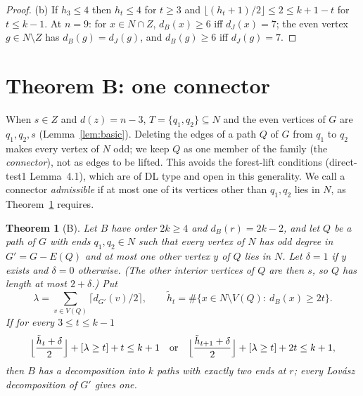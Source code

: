 \documentclass[11pt]{amsart}
\newtheorem{theorem}{Theorem}[section]
\theoremstyle{definition}
\begin{document}
\begin{proof}
(b) If $h_3\le4$ then $h_t\le4$ for $t\ge3$ and $\lfloor(h_t+1)/2\rfloor\le2\le k+1-t$ for
$t\le k-1$. At $n=9$: for $x\in N\cap Z$, $d_B(x)\ge6$ iff $d_J(x)=7$; the even vertex $g\in N\setminus Z$
has $d_B(g)=d_J(g)$, and $d_B(g)\ge6$ iff $d_J(g)=7$.
\end{proof}

\section{Theorem B: one connector}\label{sec:B}

When $s\in Z$ and $d(z)=n-3$, $T=\{q_1,q_2\}\subseteq N$ and the even vertices of $G$ are $q_1,q_2,s$
(Lemma~\ref{lem:basic}). Deleting the edges of a path $Q$ of $G$ from $q_1$ to $q_2$ makes every vertex
of $N$ odd; we keep $Q$ as one member of the family (the \emph{connector}), not as edges to be lifted.
This avoids the forest-lift conditions (direct-test1 Lemma~4.1), which are of DL type and open in this
generality. We call a connector \emph{admissible} if at most one of its vertices other than $q_1,q_2$
lies in $N$, as Theorem~\ref{thm:B} requires.

\begin{theorem}[B]\label{thm:B}
Let $B$ have order $2k\ge4$ and $d_B(r)=2k-2$, and let $Q$ be a path of $G$ with ends $q_1,q_2\in N$
such that every vertex of $N$ has odd degree in $G'=G-E(Q)$ and at most one other vertex $y$ of $Q$
lies in $N$. Let $\delta=1$ if $y$ exists and $\delta=0$ otherwise. (The other interior vertices of $Q$
are then $s$, so $Q$ has length at most $2+\delta$.) Put
\[
\lambda=\sum_{v\in V(Q)}\lceil d_{G'}(v)/2\rceil,\qquad
\tilde h_t=\#\{x\in N\setminus V(Q):\ d_B(x)\ge2t\}.
\]
If for every $3\le t\le k-1$
\[
\Bigl\lfloor\frac{\tilde h_t+\delta}{2}\Bigr\rfloor+[\lambda\ge t]+t\le k+1
\quad\text{or}\quad
\Bigl\lfloor\frac{\tilde h_{t+1}+\delta}{2}\Bigr\rfloor+[\lambda\ge t]+2t\le k+1,
\]
then $B$ has a decomposition into $k$ paths with exactly two ends at $r$; every Lov\'asz
decomposition of $G'$ gives one.
\end{theorem}
\end{document}
